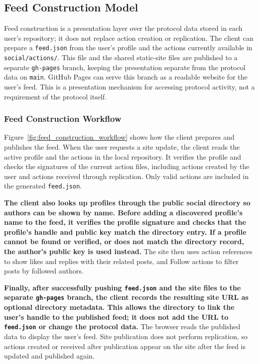 \subsection{Feed Construction Model}
Feed construction is a presentation layer over the protocol data stored in
each user's repository; it does not replace action creation or replication.
The client can prepare a \texttt{feed.json} from the user's profile and the
actions currently available in \texttt{social/actions/}. This file and the shared static-site files are published to a separate
\texttt{gh-pages} branch, keeping the presentation separate from the
protocol data on \texttt{main}. GitHub Pages can serve this branch as a
readable website for the user's feed. This is a presentation mechanism for
accessing protocol activity, not a requirement of the protocol itself.

\subsubsection*{Feed Construction Workflow}
Figure~\ref{fig:feed_construction_workflow} shows how the client prepares and
publishes the feed. When the user requests a site update, the client reads
the active profile and the actions in the local repository. It verifies the
profile and checks the signatures of the current action files, including
actions created by the user and actions received through replication. Only
valid actions are included in the generated \texttt{feed.json}.

\textbf{The client also looks up profiles through the public social directory so
authors can be shown by name. Before adding a discovered profile's name to the
feed, it verifies the profile signature and checks that the profile's handle
and public key match the directory entry. If a profile cannot be found or
verified, or does not match the directory record, the author's public key is
used instead.} The site then uses action references to show likes and replies
with their related posts, and Follow actions to filter posts by followed
authors.

\textbf{Finally, after successfully pushing \texttt{feed.json} and the site
files to the separate \texttt{gh-pages} branch, the client records the
resulting site URL as optional directory metadata. This allows the directory
to link the user's handle to the published feed; it does not add the URL to
\texttt{feed.json} or change the protocol data.} The browser reads the
published data to display the user's feed. Site publication does not perform
replication, so actions created or received after publication appear on the
site after the feed is updated and published again.


